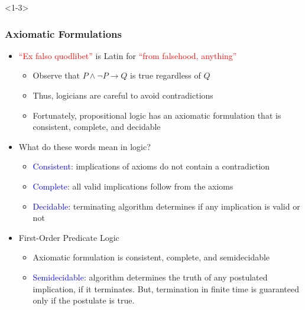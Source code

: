 \documentclass[10pt,english,aspectratio=169]{beamer}
\begin{document}
\begin{frame}<1-3> \frametitle{Axiomatic Formulations}

\begin{itemize}
\setlength\itemsep{3mm}
\item<1-> \textcolor{red}{``Ex falso quodlibet''} is Latin for \textcolor{red}{``from falsehood, anything''} \vspace{1mm}
\begin{itemize}
 \setlength\itemsep{1.5mm}
 \item Observe that $P \wedge \neg P \rightarrow Q$ is true regardless of $Q$
 \item Thus, logicians are careful to avoid contradictions
 \item Fortunately, propositional logic has an axiomatic formulation that is consistent, complete, and decidable
\end{itemize} 

\item<2-> What do these words mean in logic? \vspace{1mm}
\begin{itemize} 
 \setlength\itemsep{1.5mm}
 \item \textcolor{blue}{Consistent}: implications of axioms do not contain a contradiction
 \item \textcolor{blue}{Complete}: all valid implications follow from the axioms
 \item \textcolor{blue}{Decidable}: terminating algorithm determines if any implication is valid or not$\!\!\!\!\!\!\!$
\end{itemize}

\item<3-> First-Order Predicate Logic \vspace{1mm}
\begin{itemize} 
 \setlength\itemsep{1.5mm}
 \item Axiomatic formulation is consistent, complete, and semidecidable
 \item \textcolor{blue}{Semidecidable}:  algorithm determines the truth of any postulated implication, if it terminates.  But, termination in finite time is guaranteed only if the postulate is true.
\end{itemize}
\end{itemize}


\end{frame}
\end{document}
